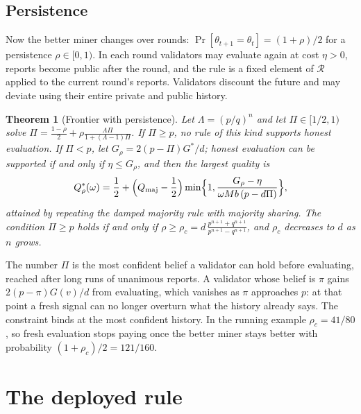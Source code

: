 \documentclass[sigconf,anonymous,review]{acmart}
\numberwithin{equation}{section}
\newtheorem{theorem}{Theorem}[section]
\newcommand{\Qmaj}{Q_{\mathrm{maj}}}
\newcommand{\Gs}{G^{*}}
\newcommand{\Rset}{\mathcal{R}}
\begin{document}
\subsection{Persistence}

Now the better miner changes over rounds: $\Pr[\theta_{t+1}=\theta_t]=(1+\rho)/2$
for a persistence $\rho\in[0,1)$. In each round validators may evaluate again
at cost $\eta>0$, reports become public after the round, and the rule is a
fixed element of $\Rset$ applied to the current round's reports. Validators
discount the future and may deviate using their entire private and public
history.

\begin{theorem}[Frontier with persistence]\label{thm:memory}
Let $\Lambda=(p/q)^n$ and let $\Pi\in[1/2,1)$ solve
$\Pi=\frac{1-\rho}2+\rho\frac{\Lambda\Pi}{1+(\Lambda-1)\Pi}$.
If $\Pi\ge p$, no rule of this kind supports honest evaluation. If $\Pi<p$, let
$G_\rho=2(p-\Pi)\Gs/d$; honest evaluation can be supported if and only if
$\eta\le G_\rho$, and then the largest quality is
\[
Q^*_\rho(\omega)=\frac12+\Bigl(\Qmaj-\frac12\Bigr)\min\Bigl\{1,\frac{G_\rho-\eta}{\omega Mb\,(p-d\Pi)}\Bigr\},
\]
attained by repeating the damped majority rule with majority sharing. The
condition $\Pi\ge p$ holds if and only if
$\rho\ge\rho_c=d\,\frac{p^{n+1}+q^{n+1}}{p^{n+1}-q^{n+1}}$, and $\rho_c$
decreases to $d$ as $n$ grows.
\end{theorem}

The number $\Pi$ is the most confident belief a validator can hold before
evaluating, reached after long runs of unanimous reports. A validator whose
belief is $\pi$ gains $2(p-\pi)G(v)/d$ from evaluating, which vanishes as $\pi$
approaches $p$: at that point a fresh signal can no longer overturn what the
history already says. The constraint binds at the most confident history. In
the running example $\rho_c=41/80$, so fresh evaluation stops paying once the
better miner stays better with probability $(1+\rho_c)/2=121/160$.

\section{The deployed rule}
\label{sec:replica}
\end{document}
